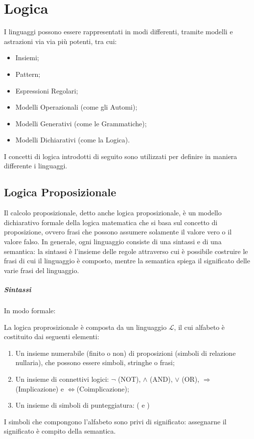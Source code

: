 \chapter{Logica}
I linguaggi possono essere rappresentati in modi differenti, tramite modelli e astrazioni via via più potenti, tra cui:
\begin{itemize}
  \item Insiemi;
  \item Pattern;
  \item Espressioni Regolari;
  \item Modelli Operazionali (come gli Automi);
  \item Modelli Generativi (come le Grammatiche);
  \item Modelli Dichiarativi (come la Logica).
\end{itemize}

\noindent
I concetti di logica introdotti di seguito sono utilizzati per definire in maniera differente i linguaggi.

\section{Logica Proposizionale}
Il calcolo proposizionale, detto anche logica proposizionale, è un modello dichiarativo formale della logica matematica che si basa sul concetto di proposizione, ovvero frasi che possono assumere solamente il valore vero o il valore falso. In generale, ogni linguaggio consiste di una sintassi e di una semantica: la sintassi è l'insieme delle regole attraverso cui è possibile costruire le frasi di cui il linguaggio è composto, mentre la semantica spiega il significato delle varie frasi del linguaggio. 

\paragraph*{Sintassi}
In modo formale:
\begin{definition}
  La logica proprosizionale è composta da un linguaggio \(\mathcal L\), il cui alfabeto è costituito dai seguenti elementi:
  \begin{enumerate}
    \item Un insieme numerabile (finito o non) di proposizioni (simboli di relazione nullaria), che possono essere simboli, stringhe o frasi;
    \item Un insieme di connettivi logici: \(\lnot\) (NOT), \(\wedge\) (AND), \(\vee\) (OR), \(\Rightarrow\) (Implicazione) e \(\Leftrightarrow \)(Coimplicazione);
    \item Un insieme di simboli di punteggiatura: ( e )
  \end{enumerate}
  I simboli che compongono l'alfabeto sono privi di significato: assegnarne il significato è compito della semantica. 
\end{definition}

